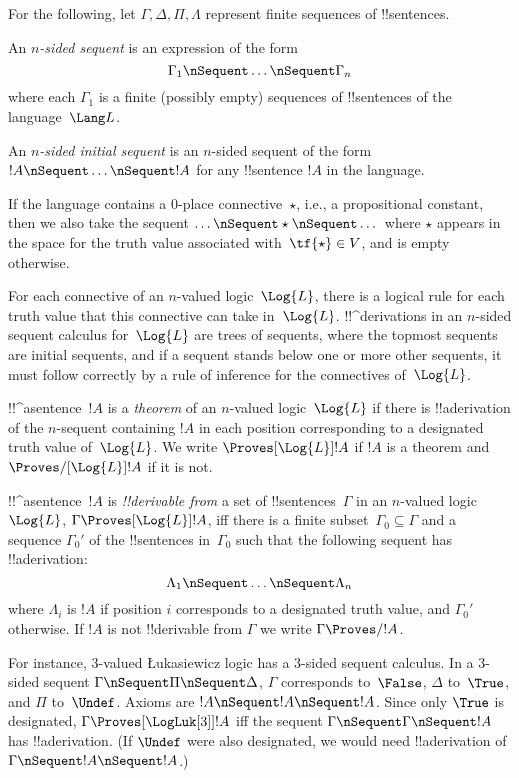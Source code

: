 \documentclass[../../../include/open-logic-section]{subfiles}
\begin{document}

For the following, let $\Gamma, \Delta, \Pi, \Lambda$ represent finite
sequences of !!{sentence}s.

\begin{defn}[Sequent]
An \emph{$n$-sided sequent} is an expression of the form
\[
\Gamma_1 \nSequent \dots \nSequent \Gamma_n
\]
where each $\Gamma_1$ is a finite (possibly empty) sequences of
!!{sentence}s of the language~$\Lang L$.
\end{defn}

\begin{defn}
An \emph{$n$-sided initial sequent} is an $n$-sided sequent of the
form $!A \nSequent \dots \nSequent !A$ for any !!{sentence} $!A$ in
the language.

If the language contains a $0$-place connective~$\star$, i.e., a
propositional constant, then we also take the sequent $\dots \nSequent
\star \nSequent \dots$ where $\star$ appears in the space for the truth
value associated with~$\tf{\star} \in V$, and is empty otherwise. 
\end{defn}

For each connective of an $n$-valued logic~$\Log{L}$, there is a
logical rule for each truth value that this connective can take
in~$\Log{L}$. !!^{derivation}s in an $n$-sided sequent calculus
for~$\Log{L}$ are trees of sequents, where the topmost sequents are
initial sequents, and if a sequent stands below one or more other
sequents, it must follow correctly by a rule of inference for the
connectives of~$\Log{L}$.

\begin{defn}[Theorems]
!!^a{sentence}~$!A$ is a \emph{theorem} of an $n$-valued
logic~$\Log{L}$ if there is !!a{derivation}
of the $n$-sequent containing $!A$ in each position corresponding to a
designated truth value of~$\Log{L}$.  We write $\Proves[\Log{L}]
!A$ if $!A$ is a theorem and $\Proves/[\Log{L}] !A$ if it is not.
\end{defn}

\begin{defn}[!!^{derivability}]
!!^a{sentence}~$!A$ is \emph{!!{derivable} from} a set of
!!{sentence}s~$\Gamma$ in an $n$-valued logic~$\Log{L}$, $\Gamma
\Proves[\Log{L}] !A$, iff there is a finite subset~$\Gamma_0 \subseteq
\Gamma$ and a sequence $\Gamma_0'$ of the !!{sentence}s in~$\Gamma_0$
such that the following sequent has  !!a{derivation}:
\[ \Lambda_1 \nSequent \dots \nSequent \Lambda_n \] where $\Lambda_i$
is $!A$ if position $i$ corresponds to a designated truth value, and
$\Gamma_0'$otherwise. If $!A$ is not !!{derivable} from $\Gamma$ we
write $\Gamma \Proves/ !A$.
\end{defn}

For instance, $3$-valued \L ukasiewicz logic has a $3$-sided sequent
calculus. In a $3$-sided sequent $\Gamma \nSequent \Pi \nSequent
\Delta$, $\Gamma$ corresponds to~$\False$, $\Delta$ to~$\True$, and
$\Pi$ to~$\Undef$.  Axioms are $!A \nSequent !A \nSequent !A$. Since
only $\True$ is designated, $\Gamma \Proves[\LogLuk[3]] !A$ iff the
sequent $\Gamma \nSequent \Gamma \nSequent !A$ has !!a{derivation}.
(If $\Undef$ were also designated, we would need !!a{derivation} of
$\Gamma \nSequent !A \nSequent !A$.)
\end{document}
